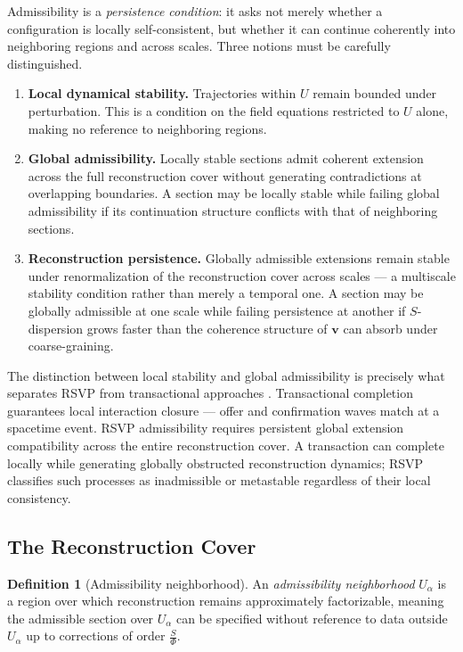\documentclass[11pt, a4paper]{article}
\theoremstyle{plain}
\theoremstyle{definition}
\newtheorem{definition}[theorem]{Definition}
\theoremstyle{remark}
\newcommand{\ctrl}{\tfrac{S}{\Phi}}
\begin{document}
Admissibility is a \emph{persistence condition}: it asks not merely whether a
configuration is locally self-consistent, but whether it can continue coherently into
neighboring regions and across scales. Three notions must be carefully distinguished.

\begin{enumerate}[label=(\roman*)]
  \item \textbf{Local dynamical stability.} Trajectories within $U$ remain bounded
    under perturbation. This is a condition on the field equations restricted to $U$
    alone, making no reference to neighboring regions.

  \item \textbf{Global admissibility.} Locally stable sections admit coherent
    extension across the full reconstruction cover without generating contradictions
    at overlapping boundaries. A section may be locally stable while failing global
    admissibility if its continuation structure conflicts with that of neighboring
    sections.

  \item \textbf{Reconstruction persistence.} Globally admissible extensions remain
    stable under renormalization of the reconstruction cover across scales --- a
    multiscale stability condition rather than merely a temporal one. A section may
    be globally admissible at one scale while failing persistence at another if
    $S$-dispersion grows faster than the coherence structure of $\mathbf{v}$ can
    absorb under coarse-graining.
\end{enumerate}

The distinction between local stability and global admissibility is precisely what
separates RSVP from transactional approaches \cite{kastner2024}. Transactional
completion guarantees local interaction closure --- offer and confirmation waves match
at a spacetime event. RSVP admissibility requires persistent global extension
compatibility across the entire reconstruction cover. A transaction can complete
locally while generating globally obstructed reconstruction dynamics; RSVP classifies
such processes as inadmissible or metastable regardless of their local consistency.

\subsection{The Reconstruction Cover}

\begin{definition}[Admissibility neighborhood]
An \emph{admissibility neighborhood} $U_\alpha$ is a region over which
reconstruction remains approximately factorizable, meaning the admissible section
over $U_\alpha$ can be specified without reference to data outside $U_\alpha$ up to
corrections of order $\ctrl$.
\end{definition}
\end{document}
